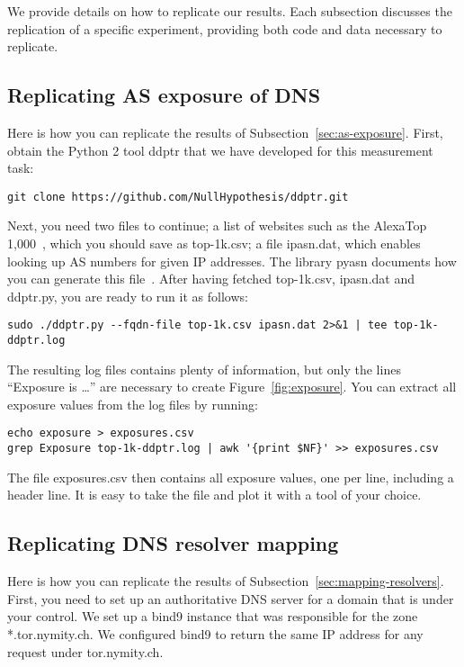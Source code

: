 \appendix

We provide details on how to replicate our results.  Each
subsection discusses the replication of a specific experiment, providing both
code and data necessary to replicate.

\subsection{Replicating AS exposure of DNS}
Here is how you can replicate the results of Subsection~\ref{sec:as-exposure}.
First, obtain the Python 2 tool ddptr that we have developed for this
measurement task:

\begin{lstlisting}
git clone https://github.com/NullHypothesis/ddptr.git
\end{lstlisting}

Next, you need two files to continue; \first a list of websites such as the
AlexaTop 1,000~\cite{alexatop1k}, which you should save as top-1k.csv; \second a
file ipasn.dat, which enables looking up AS numbers for given IP addresses.  The
library pyasn documents how you can generate this file~\cite{pyasn}.  After
having fetched top-1k.csv, ipasn.dat and ddptr.py, you are ready to run it as
follows:

\begin{lstlisting}
sudo ./ddptr.py --fqdn-file top-1k.csv ipasn.dat 2>&1 | tee top-1k-ddptr.log
\end{lstlisting}

The resulting log files contains plenty of information, but only the lines
``Exposure is \ldots'' are necessary to create Figure~\ref{fig:exposure}.  You
can extract all exposure values from the log files by running:

\begin{lstlisting}
echo exposure > exposures.csv
grep Exposure top-1k-ddptr.log | awk '{print $NF}' >> exposures.csv
\end{lstlisting}

The file exposures.csv then contains all exposure values, one per line,
including a header line.  It is easy to take the file and plot it with a tool of
your choice.

\subsection{Replicating DNS resolver mapping}
Here is how you can replicate the results of
Subsection~\ref{sec:mapping-resolvers}.  First, you need to set up an
authoritative DNS server for a domain that is under your control.  We set up
a bind9 instance that was responsible for the zone *.tor.nymity.ch.  We
configured bind9 to return the same IP address for any request under
tor.nymity.ch.

